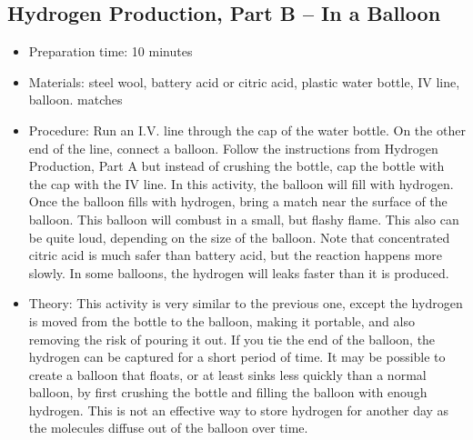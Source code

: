 \subsection{Hydrogen Production, Part B – In a Balloon}
\begin{itemize}
\item{Preparation time: 10 minutes}
\item{Materials: steel wool, battery acid or citric acid, plastic water bottle, IV line, balloon. matches}
\item{Procedure: Run an I.V. line through the cap of the water bottle. On the other end of the line, connect a balloon. Follow the instructions from Hydrogen Production, Part A but instead of crushing the bottle, cap the bottle with the cap with the IV line. In this activity, the balloon will fill with hydrogen. Once the balloon fills with hydrogen, bring a match near the surface of the balloon. This balloon will combust in a small, but flashy flame. This also can be quite loud, depending on the size of the balloon. Note that concentrated citric acid is much safer than battery acid, but the reaction happens more slowly. In some balloons, the hydrogen will leaks faster than it is produced.}
\item{Theory: This activity is very similar to the previous one, except the hydrogen is moved from the bottle to the balloon, making it portable, and also removing the risk of pouring it out. If you tie the end of the balloon, the hydrogen can be captured for a short period of time. It may be possible to create a balloon that floats, or at least sinks less quickly than a normal balloon, by first crushing the bottle and filling the balloon with enough hydrogen. This is not an effective way to store hydrogen for another day as the molecules diffuse out of the balloon over time.}
\end{itemize}

